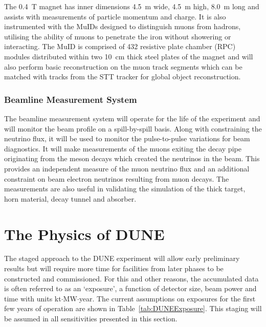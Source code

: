 The 0.4~T magnet has inner dimensions 4.5~m wide, 4.5~m high, 8.0~m long and assists with measurements of particle momentum and charge.  It is also instrumented with the MuIDs designed to distinguish muons from hadrons, utilising the ability of muons to penetrate the iron without showering or interacting.  The MuID is comprised of 432 resistive plate chamber (RPC) modules distributed within two 10~cm thick steel plates of the magnet and will also perform basic reconstruction on the muon track segments which can be matched with tracks from the STT tracker for global object reconstruction.

\subsubsection{Beamline Measurement System}\label{sec:BLM}

The beamline measurement system will operate for the life of the experiment and will monitor the beam profile on a spill-by-spill basis.  Along with constraining the neutrino flux, it will be used to monitor the pulse-to-pulse variations for beam diagnostics.  It will make measurements of the muons exiting the decay pipe originating from the meson decays which created the neutrinos in the beam.  This provides an independent measure of the muon neutrino flux and an additional constraint on beam electron neutrinos resulting from muon decays.  The measurements are also useful in validating the simulation of the thick target, horn material, decay tunnel and absorber.

\section{The Physics of DUNE}\label{sec:DUNEPhysics}

The staged approach to the DUNE experiment will allow early preliminary results but will require more time for facilities from later phases to be constructed and commissioned.  For this and other reasons, the accumulated data is often referred to as an `exposure', a function of detector size, beam power and time with units kt$\cdot$MW$\cdot$year.  The current assumptions on exposures for the first few years of operation are shown in Table~\ref{tab:DUNEExposure}.  This staging will be assumed in all sensitivities presented in this section.

